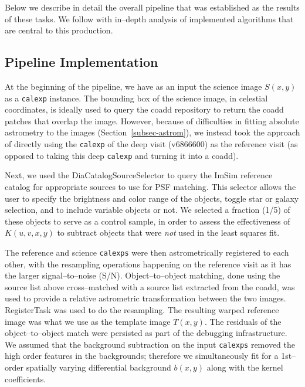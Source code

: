 \documentclass[prd, nofootinbib, floatfix, 11pt,tightenlines,times]{article}
\begin{document}
Below we describe in detail the overall pipeline that was established
as the results of these tasks.  We follow with in--depth analysis of
implemented algorithms that are central to this production.

\subsection{Pipeline Implementation}

At the beginning of the pipeline, we have as an input the science
image $S(x,y)$ as a {\tt calexp} instance.  The bounding box of the
science image, in celestial coordinates, is ideally used to query the
coadd repository to return the coadd patches that overlap the image.
However, because of difficulties in fitting absolute astrometry to the
images (Section~\ref{subsec-astrom}), we instead took the approach of
directly using the {\tt calexp} of the deep visit (v6866600) as the
reference visit (as opposed to taking this deep {\tt calexp} and
turning it into a coadd).

Next, we used the DiaCatalogSourceSelector to query the ImSim
reference catalog for appropriate sources to use for PSF matching.
This selector allows the user to specify the brightness and color
range of the objects, toggle star or galaxy selection, and to include
variable objects or not.  We selected a fraction (1/5) of these
objects to serve as a control sample, in order to assess the
effectiveness of $K(u,v,x,y)$ to subtract objects that were {\it not}
used in the least squares fit.

The reference and science {\tt calexps} were then astrometrically
registered to each other, with the resampling operations happening on
the reference visit as it has the larger signal--to--noise (S/N).
Object--to--object matching, done using the source list above
cross--matched with a source list extracted from the coadd, was used
to provide a relative astrometric transformation between the two
images.  RegisterTask was used to do the resampling.  The resulting
warped reference image was what we use as the template image $T(x,y)$.
The residuals of the object--to--object match were persisted as part
of the debugging infrastructure.  We assumed that the background
subtraction on the input {\tt calexps} removed the high order features
in the backgrounds; therefore we simultaneously fit for a 1st--order
spatially varying differential background $b(x,y)$ along with the
kernel coefficients.
\end{document}
